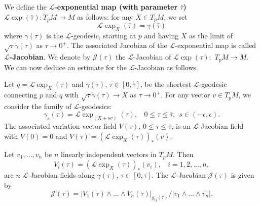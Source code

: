 \medskip
We define the {\bf $\mathcal{L}$-exponential map (with parameter
$\bar \tau$)} ${\mathcal{L}}\exp(\bar \tau): T_pM \rightarrow M $
as follows: for any $X\in T_pM$, we set
$$
{\mathcal{L}}\exp_X(\bar{\tau})=\gamma(\bar{\tau})
$$
where $\gamma(\tau)$ is the ${\mathcal{L}}$-geodesic, starting at
$p$ and having $X$ as the limit of $\sqrt{\tau}\dot{\gamma}(\tau)$
as $\tau\rightarrow 0^+$. The associated Jacobian of the
$\mathcal{L}$-exponential map is called {\bf
$\mathcal{L}$-Jacobian}. We denote
by $\mathcal{J}(\tau)$ the $\mathcal{L}$-Jacobian  of
${\mathcal{L}}\exp(\tau):$ $T_pM\rightarrow M $. We can now deduce
an estimate for the $\mathcal{L}$-Jacobian as follows.

Let $q={\mathcal{L}}\exp_X(\bar{\tau})$ and $\gamma(\tau)$,
$\tau\in[0,\bar{\tau}]$, be the shortest ${\mathcal{L}}$-geodesic
connecting $p$ and $q$ with
$\sqrt{\tau}\dot{\gamma}(\tau)\rightarrow X$ as $\tau\rightarrow
0^+$. For any vector $v\in T_pM$, we consider the family of
${\mathcal{L}}$-geodesics:
$$
\gamma_s(\tau)={\mathcal{L}}\exp_{(X+sv)}(\tau),  \ \ \ \
0\leq\tau\leq\bar{\tau},\ \  s\in(-\epsilon,\epsilon).
$$
The associated variation vector field $V(\tau)$,
$0\leq\tau\leq\bar{\tau}$, is an $\mathcal{L}$-Jacobian field with
$V(0)=0$ and $V(\tau)=({\mathcal{L}}\exp_X(\tau))_*(v)$.

Let $v_1,\dots,v_n$ be $n$ linearly independent vectors in $T_pM$.
Then
$$
V_i(\tau)=({\mathcal{L}}\exp_X(\tau))_*(v_i),  \ \ \ \ i=1,2,
\ldots,n,
$$
are $n$ $\mathcal{L}$-Jacobian fields along $\gamma(\tau)$,
$\tau\in[0,\bar{\tau}]$. The $\mathcal{L}$-Jacobian
$\mathcal{J}(\tau)$ is given by
$$
{\mathcal{J}(\tau)}=|V_1(\tau)\wedge\dots\wedge
V_n(\tau)|_{g_{ij}(\tau)}/|v_1\wedge\dots\wedge v_n|.
$$

